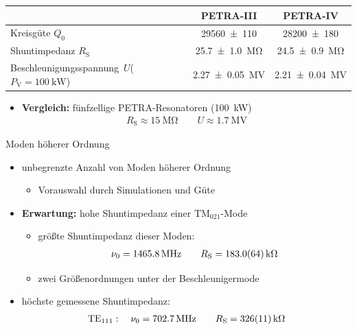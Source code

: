 \documentclass[12pt,xcolor=dvipsnames,professionalfonts]{beamer}
\begin{document}
\begin{frame}
	\centering
	{\def\arraystretch{2}\tabcolsep=10pt
	\begin{tabular}{p{3.5cm}|cc} \toprule
		& \textbf{PETRA-III} & \textbf{PETRA-IV} \\ \midrule
		Kreisgüte $Q_0$ & \num{29560 +- 110} & \num{28200 +- 180} \\
		Shuntimpedanz $R_\mathrm{S}$ & \SI{25.7 +- 1.0}{\mega\ohm} & \SI{24.5 +- 0.9}{\mega\ohm} \\
		Beschleunigungs\-spannung~$U$\newline($P_\mathrm{V} = \SI{100}{\kilo\watt}$)& \SI{2.27 +- 0.05}{\mega\volt} & \SI{2.21 +- 0.04}{\mega\volt} \\
	\end{tabular}
	}
	\vspace*{0.5cm}
	\begin{itemize}
		\item \textbf{Vergleich:} fünfzellige PETRA-Resonatoren (\SI{100}{kW})
		\begin{align*}
			R_\mathrm{S} \approx \SI{15}{\mega\ohm} \qquad U \approx \SI{1.7}{\mega\volt}
		\end{align*}
	\end{itemize}
\end{frame}

\begin{frame}{Moden höherer Ordnung}
	\begin{itemize}
		\setlength\itemsep{1.25em}
		\item unbegrenzte Anzahl von Moden höherer Ordnung
		\begin{itemize}
			\item Vorauswahl durch Simulationen und Güte
		\end{itemize}
		
		\item \textbf{Erwartung:} hohe Shuntimpedanz einer $\mathrm{TM}_{021}$-Mode
		\begin{itemize}
			\item größte Shuntimpedanz dieser Moden:
			\begin{align*}
			\nu_0 = \SI{1465.8}{\mega\hertz}\qquad R_\mathrm{S} = \SI{183.0 +- 6.4}{\kilo\ohm}
			\end{align*}
			\item zwei Größenordnungen unter der Beschleunigermode
		\end{itemize}
		
		\item höchste gemessene Shuntimpedanz:
		\begin{align*}
			\mathrm{TE}_{111}: \quad \nu_0 = \SI{702.7}{\mega\hertz} \qquad R_\mathrm{S} = \SI{326 +- 11}{\kilo\ohm}
		\end{align*}
	\end{itemize}
\end{frame}
\end{document}
